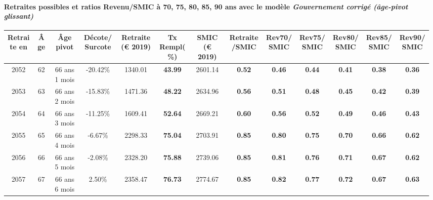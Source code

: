 \paragraph{Retraites possibles et ratios Revenu/SMIC à 70, 75, 80, 85, 90 ans avec le modèle \emph{Gouvernement corrigé (âge-pivot glissant)}}  
 
{ \scriptsize \begin{center} 
\begin{tabular}[htb]{|c|c||c|c||c|c||c||c|c|c|c|c|c|} 
\hline 
 Retraite en &  Âge &  Âge pivot &  Décote/Surcote &  Retraite (\euro{} 2019) &  Tx Rempl(\%) &  SMIC (\euro{} 2019) &  Retraite/SMIC &  Rev70/SMIC &  Rev75/SMIC &  Rev80/SMIC &  Rev85/SMIC &  Rev90/SMIC \\ 
\hline \hline 
 2052 &  62 &  66 ans 1 mois &  -20.42\% &  1340.01 &  {\bf 43.99} &  2601.14 &  {\bf {\color{red} 0.52}} &  {\bf {\color{red} 0.46}} &  {\bf {\color{red} 0.44}} &  {\bf {\color{red} 0.41}} &  {\bf {\color{red} 0.38}} &  {\bf {\color{red} 0.36}} \\ 
\hline 
 2053 &  63 &  66 ans 2 mois &  -15.83\% &  1471.36 &  {\bf 48.22} &  2634.96 &  {\bf {\color{red} 0.56}} &  {\bf {\color{red} 0.51}} &  {\bf {\color{red} 0.48}} &  {\bf {\color{red} 0.45}} &  {\bf {\color{red} 0.42}} &  {\bf {\color{red} 0.39}} \\ 
\hline 
 2054 &  64 &  66 ans 3 mois &  -11.25\% &  1609.41 &  {\bf 52.64} &  2669.21 &  {\bf {\color{red} 0.60}} &  {\bf {\color{red} 0.56}} &  {\bf {\color{red} 0.52}} &  {\bf {\color{red} 0.49}} &  {\bf {\color{red} 0.46}} &  {\bf {\color{red} 0.43}} \\ 
\hline 
 2055 &  65 &  66 ans 4 mois &  -6.67\% &  2298.33 &  {\bf 75.04} &  2703.91 &  {\bf {\color{red} 0.85}} &  {\bf {\color{red} 0.80}} &  {\bf {\color{red} 0.75}} &  {\bf {\color{red} 0.70}} &  {\bf {\color{red} 0.66}} &  {\bf {\color{red} 0.62}} \\ 
\hline 
 2056 &  66 &  66 ans 5 mois &  -2.08\% &  2328.20 &  {\bf 75.88} &  2739.06 &  {\bf {\color{red} 0.85}} &  {\bf {\color{red} 0.81}} &  {\bf {\color{red} 0.76}} &  {\bf {\color{red} 0.71}} &  {\bf {\color{red} 0.67}} &  {\bf {\color{red} 0.62}} \\ 
\hline 
 2057 &  67 &  66 ans 6 mois &  2.50\% &  2358.47 &  {\bf 76.73} &  2774.67 &  {\bf {\color{red} 0.85}} &  {\bf {\color{red} 0.82}} &  {\bf {\color{red} 0.77}} &  {\bf {\color{red} 0.72}} &  {\bf {\color{red} 0.67}} &  {\bf {\color{red} 0.63}} \\ 
\hline 
\hline 
\end{tabular} 
\end{center} } 
